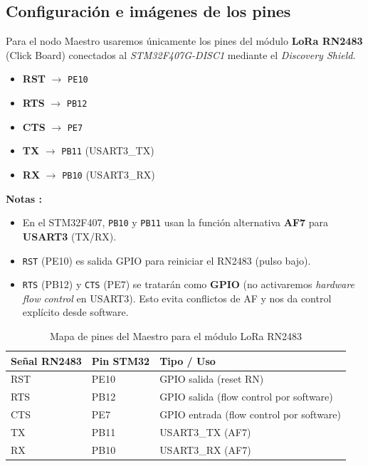 \documentclass[a4paper,12pt]{article}
\begin{document}
\subsection{Configuración e imágenes de los pines}
Para el nodo Maestro usaremos únicamente los pines del módulo \textbf{LoRa RN2483} (Click Board) conectados al \textit{STM32F407G-DISC1} mediante el \textit{Discovery Shield}. 

\begin{itemize}
    \item \textbf{RST} $\rightarrow$ \texttt{PE10}
    \item \textbf{RTS} $\rightarrow$ \texttt{PB12}
    \item \textbf{CTS} $\rightarrow$ \texttt{PE7}
    \item \textbf{TX}  $\rightarrow$ \texttt{PB11} (USART3\_TX)
    \item \textbf{RX}  $\rightarrow$ \texttt{PB10} (USART3\_RX)
\end{itemize}

\noindent
\textbf{Notas :}
\begin{itemize}
    \item En el STM32F407, \texttt{PB10} y \texttt{PB11} usan la función alternativa \textbf{AF7} para \textbf{USART3} (TX/RX).
    \item \texttt{RST} (PE10) es salida GPIO para reiniciar el RN2483 (pulso bajo).
    \item \texttt{RTS} (PB12) y \texttt{CTS} (PE7) se tratarán como \textbf{GPIO} (no activaremos \emph{hardware flow control} en USART3). Esto evita conflictos de AF y nos da control explícito desde software.
\end{itemize}

\begin{table}[H]
\centering
\caption{Mapa de pines del Maestro para el módulo LoRa RN2483}
\label{tab:pines_maestro_lora}
\begin{tabular}{lll}
\toprule
\textbf{Señal RN2483} & \textbf{Pin STM32} & \textbf{Tipo / Uso} \\
\midrule
RST  & PE10 & GPIO salida (reset RN) \\
RTS  & PB12 & GPIO salida (flow control por software) \\
CTS  & PE7  & GPIO entrada (flow control por software) \\
TX   & PB11 & USART3\_TX (AF7) \\
RX   & PB10 & USART3\_RX (AF7) \\
\bottomrule
\end{tabular}
\end{table}
\end{document}
